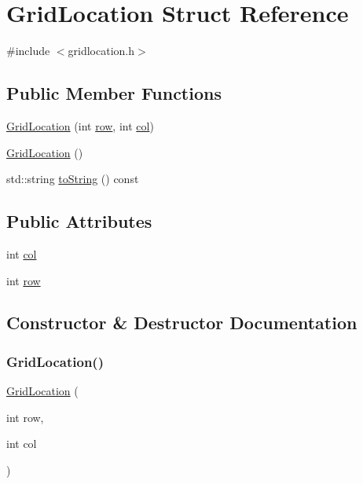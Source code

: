 \hypertarget{structGridLocation}{}\section{Grid\+Location Struct Reference}
\label{structGridLocation}


{\ttfamily \#include $<$gridlocation.\+h$>$}

\subsection*{Public Member Functions}
\begin{DoxyCompactItemize}
\item 
\mbox{\hyperlink{structGridLocation_ab5f3cf84ab1b64d9703cb27971a804a3}{Grid\+Location}} (int \mbox{\hyperlink{structGridLocation_af1d3cff2e4538e23400e260bae3dadad}{row}}, int \mbox{\hyperlink{structGridLocation_afb52e720f5f0c483db5861f9e42e924e}{col}})
\item 
\mbox{\hyperlink{structGridLocation_a988eb3478cf07ee43da38c2475d95b01}{Grid\+Location}} ()
\item 
std\+::string \mbox{\hyperlink{structGridLocation_a1fe5121d6528fdea3f243321b3fa3a49}{to\+String}} () const
\end{DoxyCompactItemize}
\subsection*{Public Attributes}
\begin{DoxyCompactItemize}
\item 
int \mbox{\hyperlink{structGridLocation_afb52e720f5f0c483db5861f9e42e924e}{col}}
\item 
int \mbox{\hyperlink{structGridLocation_af1d3cff2e4538e23400e260bae3dadad}{row}}
\end{DoxyCompactItemize}


\subsection{Constructor \& Destructor Documentation}
\mbox{\label{structGridLocation_ab5f3cf84ab1b64d9703cb27971a804a3}} 
\subsubsection{\texorpdfstring{Grid\+Location()}{GridLocation()}\hspace{0.1cm}{\footnotesize\ttfamily [1/2]}}
{\footnotesize\ttfamily \mbox{\hyperlink{structGridLocation}{Grid\+Location}} (\begin{DoxyParamCaption}\item[{int}]{row,  }\item[{int}]{col }\end{DoxyParamCaption})}

